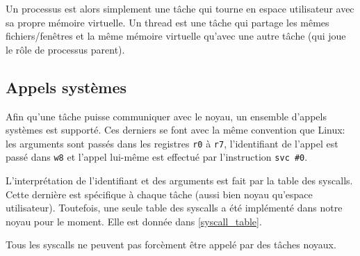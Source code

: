 \documentclass[french, 12pt]{article}
\begin{document}
Un processus est alors simplement une tâche qui tourne en espace utilisateur avec sa propre mémoire virtuelle. Un thread est une tâche qui partage les mêmes fichiers/fenêtres et la même mémoire virtuelle qu'avec une autre tâche (qui joue le rôle de processus parent).

\subsection{Appels systèmes}

Afin qu'une tâche puisse communiquer avec le noyau, un ensemble d'appels systèmes est supporté. Ces derniers se font avec la même convention que Linux: les arguments sont passés dans les registres \texttt{r0} à \texttt{r7}, l'identifiant de l'appel est passé dans \texttt{w8} et l'appel lui-même est effectué par l'instruction \texttt{svc \#0}.

L'interprétation de l'identifiant et des arguments est fait par la table des syscalls. Cette dernière est spécifique à chaque tâche (aussi bien noyau qu'espace utilisateur). Toutefois, une seule table des syscalls a été implémenté dans notre noyau pour le moment. Elle est donnée dans \ref{syscall_table}.

Tous les syscalls ne peuvent pas forcèment être appelé par des tâches noyaux.
\end{document}
